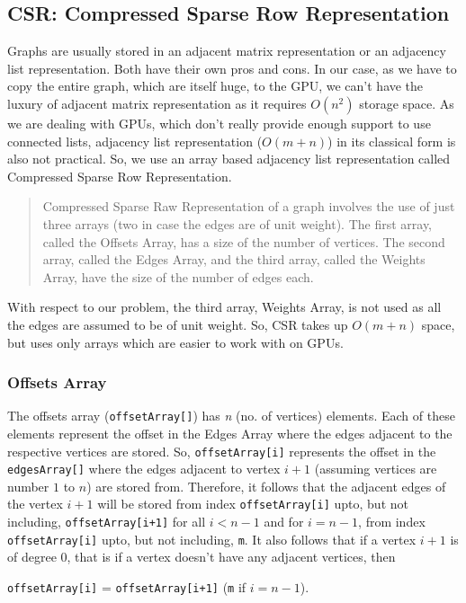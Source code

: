 \documentclass[MTech]{iitmdiss}
\begin{document}
\subsection{CSR: Compressed Sparse Row Representation}
Graphs are usually stored in an adjacent matrix representation or an adjacency list representation. Both have their own pros and cons. In our case, as we have to copy the entire graph, which are itself huge, to the GPU, we can't have the luxury of adjacent matrix representation as it requires $O(n^{2})$ storage space. As we are dealing with GPUs, which don't really provide enough support to use connected lists, adjacency list representation ($O(m+n)$) in its classical form is also not practical. So, we use an array based adjacency list representation called Compressed Sparse Row Representation.
\begin{verse}
Compressed Sparse Raw Representation of a graph involves the use of just three arrays (two in case the edges are of unit weight). The first array, called the Offsets Array, has a size of the number of vertices. The second array, called the Edges Array, and the third array, called the Weights Array, have the size of the number of edges each.
\end{verse}
With respect to our problem, the third array, Weights Array, is not used as all the edges are assumed to be of unit weight. So, CSR takes up $O(m+n)$ space, but uses only arrays which are easier to work with on GPUs.
\subsubsection{Offsets Array}
The offsets array (\verb+offsetArray[]+) has \textit{n} (no. of vertices) elements. Each of these elements represent the offset in the Edges Array where the edges adjacent to the respective vertices are stored. So, \verb+offsetArray[i]+ represents the offset in the \verb+edgesArray[]+ where the edges adjacent to vertex $i+1$ (assuming vertices are number $1$ to $n$) are stored from. Therefore, it follows that the adjacent edges of the vertex $i+1$ will be stored from index \verb+offsetArray[i]+ upto, but not including, \verb|offsetArray[i+1]| for all $i<n-1$ and for $i=n-1$, from index \verb+offsetArray[i]+ upto, but not including, \verb|m|. It also follows that if a vertex $i+1$ is of degree 0, that is if a vertex doesn't have any adjacent vertices, then
\begin{center}
\verb+offsetArray[i]+ = \verb|offsetArray[i+1]| (\verb+m+ if $i = n-1$).
\end{center}
\end{document}
